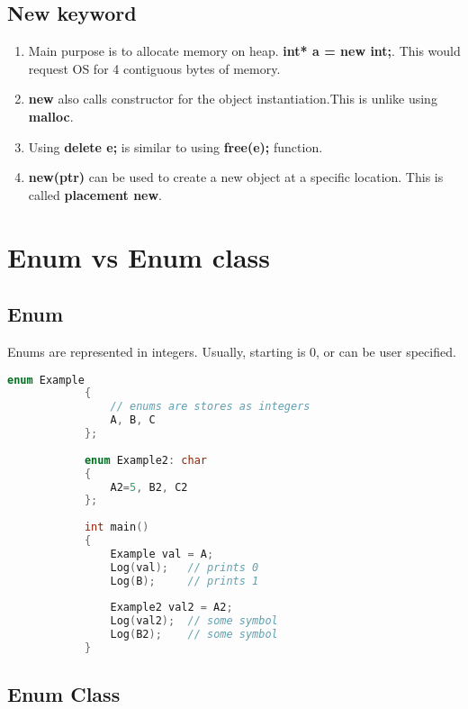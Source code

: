 \documentclass{article}
\begin{document}
    \subsection{New keyword}
    \begin{enumerate}
        \item Main purpose is to allocate memory on heap. \textbf{int* a = new int;}. This would request OS for 4 contiguous bytes of memory. 
        \item \textbf{new} also calls constructor for the object instantiation.This is unlike using \textbf{malloc}. 
        \item Using \textbf{delete e;} is similar to using \textbf{free(e);} function.
        \item \textbf{new(ptr)} can be used to create a new object at a specific location. This is called \textbf{placement new}.
    \end{enumerate}         

\section{Enum vs Enum class}
    \subsection{Enum}
    Enums are represented in integers.
    Usually, starting is 0, or can be user specified. 
        \begin{lstlisting}[language=C++, caption=Enum example]
            enum Example
            {
            	// enums are stores as integers
            	A, B, C
            };
            
            enum Example2: char
            {
            	A2=5, B2, C2
            };
            
            int main()
            {
            	Example val = A;
            	Log(val);	// prints 0
            	Log(B);		// prints 1
            
            	Example2 val2 = A2;
            	Log(val2);	// some symbol
            	Log(B2);	// some symbol
            }
        \end{lstlisting}
        
    \subsection{Enum Class}
    
\end{document}
